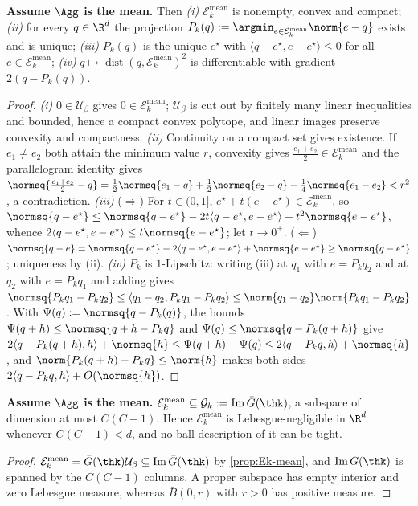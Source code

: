 \begin{lemma}[Projection]
\label{lem:proj}
\textbf{Assume $\Agg$ is the mean.} Then \emph{(i)} $\mathcal{E}_k^{\mathrm{mean}}$ is nonempty, convex and compact; \emph{(ii)} for every $q\in\R^d$ the projection $P_k(q):=\argmin_{e\in\mathcal{E}_k^{\mathrm{mean}}}\norm{e-q}$ exists and is unique; \emph{(iii)} $P_k(q)$ is the unique $e^\star$ with $\langle q-e^\star,e-e^\star\rangle\le0$ for all $e\in\mathcal{E}_k^{\mathrm{mean}}$; \emph{(iv)} $q\mapsto\operatorname{dist}(q,\mathcal{E}_k^{\mathrm{mean}})^2$ is differentiable with gradient $2(q-P_k(q))$.
\end{lemma}
\begin{proof}
\emph{(i)} $0\in\mathcal{U}_\beta$ gives $0\in\mathcal{E}_k^{\mathrm{mean}}$; $\mathcal{U}_\beta$ is cut out by finitely many linear inequalities and bounded, hence a compact convex polytope, and linear images preserve convexity and compactness.
\emph{(ii)} Continuity on a compact set gives existence. If $e_1\neq e_2$ both attain the minimum value $r$, convexity gives $\tfrac{e_1+e_2}2\in\mathcal{E}_k^{\mathrm{mean}}$ and the parallelogram identity gives $\normsq{\tfrac{e_1+e_2}2-q}=\tfrac12\normsq{e_1-q}+\tfrac12\normsq{e_2-q}-\tfrac14\normsq{e_1-e_2}<r^2$, a contradiction.
\emph{(iii)} ($\Rightarrow$) For $t\in(0,1]$, $e^\star+t(e-e^\star)\in\mathcal{E}_k^{\mathrm{mean}}$, so $\normsq{q-e^\star}\le\normsq{q-e^\star}-2t\langle q-e^\star,e-e^\star\rangle+t^2\normsq{e-e^\star}$, whence $2\langle q-e^\star,e-e^\star\rangle\le t\normsq{e-e^\star}$; let $t\to0^+$. ($\Leftarrow$) $\normsq{q-e}=\normsq{q-e^\star}-2\langle q-e^\star,e-e^\star\rangle+\normsq{e-e^\star}\ge\normsq{q-e^\star}$; uniqueness by (ii).
\emph{(iv)} $P_k$ is $1$-Lipschitz: writing (iii) at $q_1$ with $e=P_kq_2$ and at $q_2$ with $e=P_kq_1$ and adding gives $\normsq{P_kq_1-P_kq_2}\le\langle q_1-q_2,P_kq_1-P_kq_2\rangle\le\norm{q_1-q_2}\norm{P_kq_1-P_kq_2}$. With $\Psi(q):=\normsq{q-P_k(q)}$, the bounds $\Psi(q+h)\le\normsq{q+h-P_kq}$ and $\Psi(q)\le\normsq{q-P_k(q+h)}$ give
$2\langle q-P_k(q+h),h\rangle+\normsq{h}\le\Psi(q+h)-\Psi(q)\le2\langle q-P_kq,h\rangle+\normsq{h}$,
and $\norm{P_k(q+h)-P_kq}\le\norm{h}$ makes both sides $2\langle q-P_kq,h\rangle+O(\normsq{h})$.
\end{proof}

\begin{proposition}
\label{prop:dim}
\textbf{Assume $\Agg$ is the mean.} $\mathcal{E}_k^{\mathrm{mean}}\subseteq\mathcal{G}_k:=\operatorname{Im}\bar G(\thk)$, a subspace of dimension at most $C(C-1)$. Hence $\mathcal{E}_k^{\mathrm{mean}}$ is Lebesgue-negligible in $\R^d$ whenever $C(C-1)<d$, and no ball description of it can be tight.
\end{proposition}
\begin{proof}
$\mathcal{E}_k^{\mathrm{mean}}=\bar G(\thk)\mathcal{U}_\beta\subseteq\operatorname{Im}\bar G(\thk)$ by \cref{prop:Ek-mean}, and $\operatorname{Im}\bar G(\thk)$ is spanned by the $C(C-1)$ columns. A proper subspace has empty interior and zero Lebesgue measure, whereas $\bar B(0,r)$ with $r>0$ has positive measure.
\end{proof}

